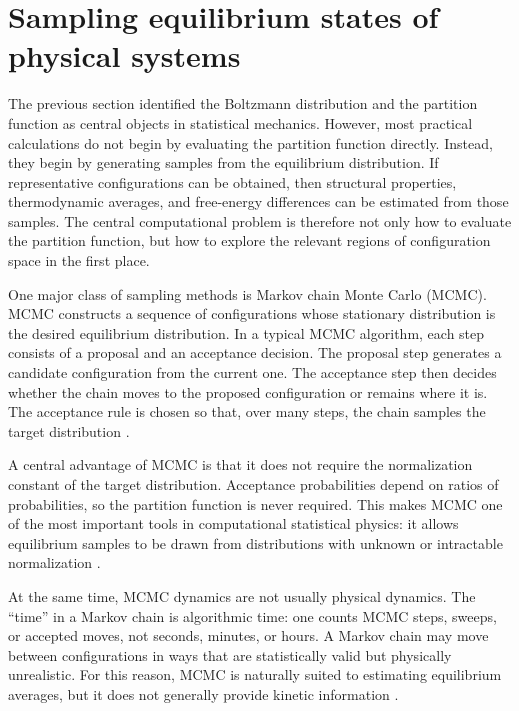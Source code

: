 \section{Sampling equilibrium states of physical systems}
\label{ch1:sec:sampling-equilibrium-states}

The previous section identified the Boltzmann distribution and the partition function as central objects in statistical mechanics. However, most practical calculations do not begin by evaluating the partition function directly. Instead, they begin by generating samples from the equilibrium distribution. If representative configurations can be obtained, then structural properties, thermodynamic averages, and free-energy differences can be estimated from those samples. The central computational problem is therefore not only how to evaluate the partition function, but how to explore the relevant regions of configuration space in the first place.

One major class of sampling methods is Markov chain Monte Carlo (MCMC). MCMC constructs a sequence of configurations whose stationary distribution is the desired equilibrium distribution. In a typical MCMC algorithm, each step consists of a proposal and an acceptance decision. The proposal step generates a candidate configuration from the current one. The acceptance step then decides whether the chain moves to the proposed configuration or remains where it is. The acceptance rule is chosen so that, over many steps, the chain samples the target distribution \citep{metropolis1953equation,hastings1970monte}.

A central advantage of MCMC is that it does not require the normalization constant of the target distribution. Acceptance probabilities depend on ratios of probabilities, so the partition function is never required. This makes MCMC one of the most important tools in computational statistical physics: it allows equilibrium samples to be drawn from distributions with unknown or intractable normalization \citep{metropolis1953equation,hastings1970monte}.

At the same time, MCMC dynamics are not usually physical dynamics. The ``time'' in a Markov chain is algorithmic time: one counts MCMC steps, sweeps, or accepted moves, not seconds, minutes, or hours. A Markov chain may move between configurations in ways that are statistically valid but physically unrealistic. For this reason, MCMC is naturally suited to estimating equilibrium averages, but it does not generally provide kinetic information \citep{allen2017computer}.

